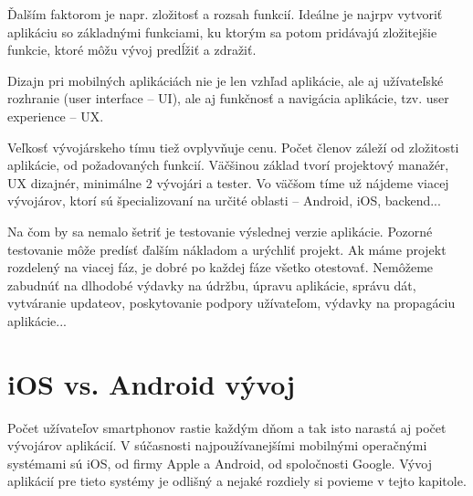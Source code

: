 \documentclass[10pt,twoside,slovak,a4paper]{article}
\begin{document}
Ďalším faktorom je napr. zložitosť a rozsah funkcií. Ideálne je najrpv vytvoriť aplikáciu so základnými funkciami, ku ktorým sa potom pridávajú zložitejšie funkcie, ktoré môžu vývoj predĺžiť a zdražiť.

Dizajn pri mobilných aplikáciách nie je len vzhľad aplikácie, ale aj užívateľské rozhranie (user interface – UI), ale aj funkčnosť a navigácia aplikácie, tzv. user experience – UX.

Veľkosť vývojárskeho tímu tiež ovplyvňuje cenu. Počet členov záleží od zložitosti aplikácie, od požadovaných funkcií. Väčšinou základ tvorí projektový manažér, UX dizajnér, minimálne 2 vývojári a tester. Vo väčšom tíme už nájdeme viacej vývojárov, ktorí sú špecializovaní na určité oblasti – Android, iOS, backend...

Na čom by sa nemalo šetriť je testovanie výslednej verzie aplikácie. Pozorné testovanie môže predísť ďalším nákladom a urýchliť projekt. Ak máme projekt rozdelený na viacej fáz, je dobré po každej fáze všetko otestovať.
Nemôžeme zabudnúť na dlhodobé výdavky na údržbu, úpravu aplikácie, správu dát, vytváranie updateov, poskytovanie podpory užívateľom, výdavky na propagáciu aplikácie...

\cite{pixelfield}



\section{iOS vs. Android vývoj}
\quad Počet užívateľov smartphonov  rastie každým dňom a tak isto narastá aj počet vývojárov aplikácií. V súčasnosti najpoužívanejšími mobilnými operačnými systémami sú iOS, od firmy Apple a Android, od spoločnosti Google. Vývoj aplikácií pre tieto systémy je odlišný a nejaké rozdiely si povieme v tejto kapitole.
\end{document}
